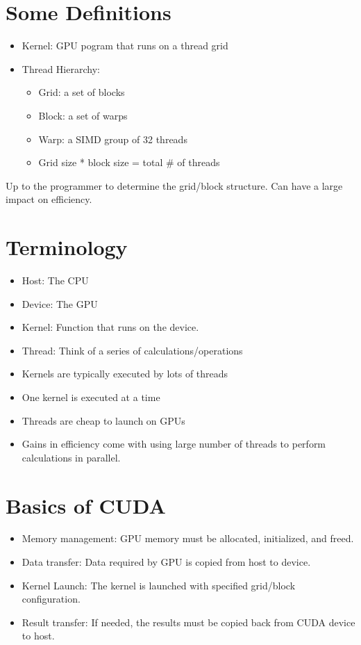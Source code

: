 \documentclass[]{article}
\begin{document}
\section*{Some Definitions}
\begin{itemize}
\item
Kernel: GPU pogram that runs on a thread grid
\item
Thread Hierarchy:
\begin{itemize}
\item
Grid: a set of blocks
\item
Block: a set of warps
\item
Warp: a SIMD group of 32 threads
\item
Grid size * block size = total \# of threads
\end{itemize}
\end{itemize}

Up to the programmer to determine the grid/block structure.  Can have a large impact on efficiency.

\section*{Terminology}
\begin{itemize}
\item
Host: The CPU
\item
Device: The GPU
\item
Kernel: Function that runs on the device.
\item
Thread: Think of a series of calculations/operations
\item
Kernels are typically executed by lots of threads
\item
One kernel is executed at a time
\item
Threads are cheap to launch on GPUs
\item
Gains in efficiency come with using large number of threads to perform calculations in parallel.
\end{itemize}


\section*{Basics of CUDA}
\begin{itemize}
\item
Memory management: GPU memory must be allocated, initialized, and freed.
\item
Data transfer: Data required by GPU is copied from host to device.
\item
Kernel Launch: The kernel is launched with specified grid/block configuration.
\item
Result transfer: If needed, the results must be copied back from CUDA device to host.
\end{itemize}
\end{document}
